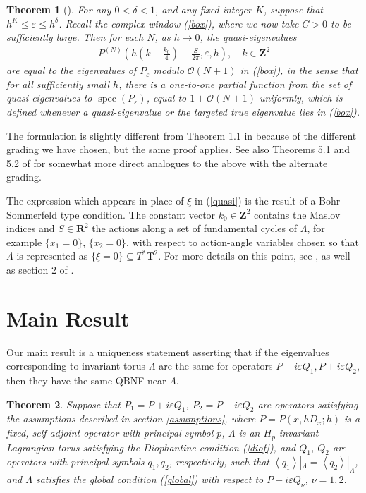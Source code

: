 \documentclass[12pt,lettersize]{article}
\DeclareMathOperator{\spec}{spec}
\renewcommand{\epsilon}{\varepsilon}
\theoremstyle{plain}%
\newtheorem{theorem}{Theorem}
\numberwithin{theorem}{section}
\numberwithin{equation}{section}
\theoremstyle{definition}
\theoremstyle{remark}
\begin{document}
{\begin{theorem}[\cite{HSV}]
For any $0 < \delta < 1$, and any fixed integer $K$, suppose that $h^K \leq \epsilon \leq h^\delta$. Recall the complex window (\ref{box}), where we now take $C > 0$ to be sufficiently large. Then for each $N$, as $h\to 0$, the quasi-eigenvalues
\begin{align}\label{quasi}
\textstyle  P^{(N)}\left(h\left(k-\frac{k_0}{4}\right) - \frac{S}{2\pi},\epsilon,h\right),\quad k \in \mathbf{Z}^2
\end{align}
%
are equal to the eigenvalues of $P_\epsilon$ modulo $\mathcal{O}(N+1)$ in (\ref{box}), in the sense that for all sufficiently small $h$, there is a one-to-one partial function from the set of quasi-eigenvalues to $\spec(P_\epsilon)$, equal to $1 + \mathcal{O}(N+1)$ uniformly, which is defined whenever a quasi-eigenvalue or the targeted true eigenvalue lies in (\ref{box}). 
\end{theorem}

The formulation is slightly different from Theorem 1.1 in \cite{HSV} because of the different grading we have chosen, but the same proof applies. See also Theorems 5.1 and 5.2 of \cite{HSV} for somewhat more direct analogues to the above with the alternate grading.

The expression which appears in place of $\xi$ in (\ref{quasi}) is the result of a Bohr-Sommerfeld type condition. The constant vector $k_0\in \mathbf{Z}^2$ contains the Maslov indices and $S\in \mathbf{R}^2$ the actions along a set of fundamental cycles of $\Lambda$, for example $\{x_1 = 0\}$, $\{x_2 = 0\}$, with respect to action-angle variables chosen so that $\Lambda$ is represented as $\{\xi = 0\} \subseteq T^*\mathbf{T}^2$. For more details on this point, see \cite{HSV}, as well as section 2 of \cite{HS}.


\section{Main Result}\label{Main}
 
Our main result is a uniqueness statement asserting that if the eigenvalues corresponding to invariant torus $\Lambda$ are the same for operators $P + i\epsilon Q_1,P+i\epsilon Q_2$, then they have the same QBNF near $\Lambda$.

\begin{theorem}\label{thm1}
Suppose that $P_1 = P+i\epsilon Q_1$, $P_2 = P+i\epsilon Q_2$ are operators satisfying the assumptions  described in section \ref{assumptions}, where $P = P(x,hD_x;h)$ is a fixed, self-adjoint operator with principal symbol $p$, $\Lambda$ is an $H_p$-invariant Lagrangian torus satisfying the Diophantine condition (\ref{diof}), and $Q_1$, $Q_2$ are operators with principal symbols $q_1,q_2$, respectively, such that $\left\langle q_1 \right\rangle|_{\Lambda} = \left\langle q_2 \right\rangle|_{\Lambda}$, and $\Lambda$ satisfies the global condition (\ref{global}) with respect to $P + i\epsilon Q_\nu$, $\nu = 1,2$.


\end{theorem}}
\end{document}
